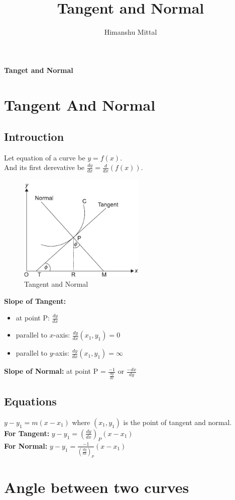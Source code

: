 \documentclass[11pt,a4paper,landscape]{article}
\author{Himanshu Mittal}
\title{Tangent and Normal}
\begin{document}
\begin{multicols*}{2}
\textbf{\Huge{Tanget and Normal}}
\section{Tangent And Normal}
	\subsection{Introuction}
	Let equation of a curve be $y=f(x)$.\\[1mm]
	And its first derevative be $\frac{dy}{dx}=\frac{d}{dx}(f(x))$.
	\begin{figure}[H]
		\centering
		\includegraphics[width=6cm]{P1}
		\caption{Tangent and Normal}
	\end{figure}

	\textbf{Slope of Tangent:}
	\begin{itemize}
	\item at point P: $\frac{dy}{dx}$
	\item parallel to $x$-axis: $\frac{dy}{dx}(x_1,y_1)=0$
	\item parallel to $y$-axis: $\frac{dy}{dx}(x_1,y_1)=\infty$
	\end{itemize}

	\textbf{Slope of Normal:} at point P = $\frac{-1}{\frac{dy}{dx}}$ or $\frac{-dx}{dy}$
	\subsection{Equations}
	$y-y_1=m(x-x_1)$ where $(x_1,y_1)$ is the point of tangent and normal.\\[2mm]
	\textbf{For Tangent:} $y-y_1=\left(\frac{dy}{dx}\right)_P(x-x_1)$\\[3mm]
	\textbf{For Normal:} $y-y_1=\frac{-1}{\left(\frac{dy}{dx}\right)_P}(x-x_1)$
\section{Angle between two curves}

\end{multicols*}
\end{document}
